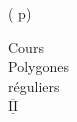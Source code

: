 ( p)

\begin{flushright}
Cours\\
Polygones\\
réguliers\\
$\overline{\underline{\mathrm{II}}}$
\end{flushright}
